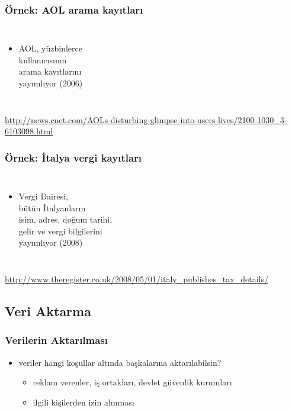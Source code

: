 \documentclass[dvipsnames]{beamer}
\theoremstyle{definition}
\theoremstyle{example}
\theoremstyle{plain}
\begin{document}
\begin{frame}
  \frametitle{Örnek: AOL arama kayıtları}

  \begin{columns}

    \begin{itemize}
      \item AOL, yüzbinlerce\\
        kullanıcısının\\
        arama kayıtlarını\\
        yayımlıyor (2006)
    \end{itemize}
  \end{columns}

  \medskip
  \tiny{\url{http://news.cnet.com/AOLs-disturbing-glimpse-into-users-lives/2100-1030_3-6103098.html}}\\
\end{frame}

\begin{frame}
  \frametitle{Örnek: İtalya vergi kayıtları}

  \begin{columns}

    \begin{itemize}
      \item Vergi Dairesi,\\
        bütün İtalyanların\\
        isim, adres, doğum tarihi,\\
        gelir ve vergi bilgilerini\\
        yayımlıyor (2008)
    \end{itemize}
  \end{columns}

  \medskip
  \tiny{\url{http://www.theregister.co.uk/2008/05/01/italy_publishes_tax_details/}}\\
\end{frame}

\subsection{Veri Aktarma}

\begin{frame}
  \frametitle{Verilerin Aktarılması}

  \begin{itemize}
    \item veriler hangi koşullar altında başkalarına aktarılabilsin?
    \begin{itemize}
      \item reklam verenler, iş ortakları, devlet güvenlik kurumları
      \item ilgili kişilerden izin alınması
    \end{itemize}
  \end{itemize}
\end{frame}
\end{document}
